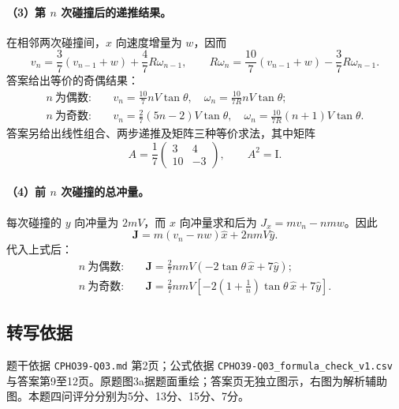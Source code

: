 \paragraph{（3）第 $n$ 次碰撞后的递推结果。}
在相邻两次碰撞间，$x$ 向速度增量为 $w$，因而
\[
v_n=\frac37(v_{n-1}+w)+\frac47R\omega_{n-1},\qquad
R\omega_n=\frac{10}{7}(v_{n-1}+w)-\frac37R\omega_{n-1}.
\]
答案给出等价的奇偶结果：
\[
\boxed{\begin{aligned}
n\ \text{为偶数}:&\quad v_n=\frac{10}{7}nV\tan\theta,\quad \omega_n=\frac{10}{7R}nV\tan\theta;\\
n\ \text{为奇数}:&\quad v_n=\frac27(5n-2)V\tan\theta,\quad \omega_n=\frac{10}{7R}(n+1)V\tan\theta.
\end{aligned}}
\]
答案另给出线性组合、两步递推及矩阵三种等价求法，其中矩阵
\[
A=\frac17\begin{pmatrix}3&4\\10&-3\end{pmatrix},\qquad A^2=\mathrm{I}.
\]

\paragraph{（4）前 $n$ 次碰撞的总冲量。}
每次碰撞的 $y$ 向冲量为 $2mV$，而 $x$ 向冲量求和后为 $J_x=mv_n-nmw$。因此
\[
\mathbf J=m(v_n-nw)\hat{x}+2nmV\hat{y}.
\]
代入上式后：
\[
\boxed{\begin{aligned}
n\ \text{为偶数}:&\quad \mathbf J=\frac27nmV(-2\tan\theta\,\hat{x}+7\hat{y});\\
n\ \text{为奇数}:&\quad \mathbf J=\frac27nmV\left[-2\left(1+\frac1n\right)\tan\theta\,\hat{x}+7\hat{y}\right].
\end{aligned}}
\]

\subsection{转写依据}
题干依据 \texttt{CPHO39-Q03.md} 第2页；公式依据 \texttt{CPHO39-Q03\_formula\_check\_v1.csv} 与答案第9至12页。原题图3a据题面重绘；答案页无独立图示，右图为解析辅助图。本题四问评分分别为5分、13分、15分、7分。
